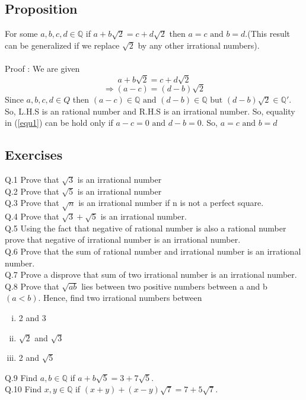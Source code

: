 \subsection{Proposition}
For some $a,b,c,d \in \mathbb{Q}$ if $a+b\sqrt{2} = c+d\sqrt{2}$ then $a = c \text{ and } b = d.$(This result can be generalized if we replace $\sqrt{2}$ by any other irrational numbers).\\\\
Proof : We are given
\begin{equation}
\label{equ1}
    a+b\sqrt{2} = c+d\sqrt{2}
\end{equation}    
$$\Rightarrow (a-c) = (d-b)\sqrt{2}$$
Since $a,b,c,d \in Q$ then $(a-c) \in \mathbb{Q} \text{ and } (d-b) \in \mathbb{Q} \text{ but } (d-b)\sqrt{2} \in \mathbb{Q'}.$ So, L.H.S is an rational number and R.H.S is an irrational number. So, equality in (\ref{equ1}) can be hold only if $a-c = 0 \text{ and } d-b = 0$. So, $a = c \text{ and } b = d$

\subsection{Exercises}
Q.1 Prove that $\sqrt{3}$ is an irrational number\\
Q.2 Prove that $\sqrt{5}$ is an irrational number\\
Q.3 Prove that $\sqrt{n}$ is an irrational number if n is not a
perfect square.\\
Q.4 Prove that $\sqrt{3}+\sqrt{5}$ is an irrational number.\\
Q.5 Using the fact that negative of rational number is also a
rational number prove that
negative of irrational number is an irrational number.\\
Q.6 Prove that the sum of rational number and irrational
number is an irrational number.\\
Q.7 Prove a disprove that sum of two irrational number is an
irrational number.\\
Q.8 Prove that $\sqrt{ab}$ lies between two positive numbers between a
and b $(a < b)$. Hence, find two
irrational numbers between\\
\begin{multicols}{3}
\begin{enumerate}[(i)]
\item 2 and 3
\item $\sqrt{2}$ and $\sqrt{3}$
\item 2 and $\sqrt{5}$
\end{enumerate}
\end{multicols}
\noindent Q.9 Find $a,b \in \mathbb{Q}$ if $a+b\sqrt{5} = 3+7\sqrt{5}$.\\
Q.10 Find $x,y \in \mathbb{Q}$ if $(x+y)+(x-y)\sqrt{7} = 7+5\sqrt{7}.$
